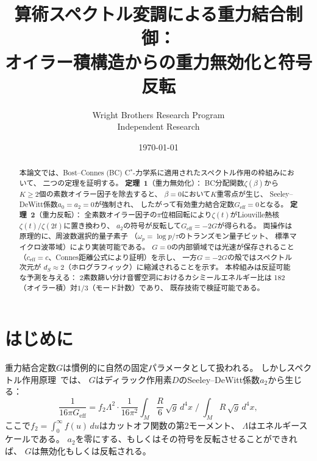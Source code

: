 \documentclass[a4paper,11pt]{article}
\begin{document}
\title{算術スペクトル変調による重力結合制御：\\
オイラー積構造からの重力無効化と符号反転}

\author{Wright Brothers Research Program\\
\small Independent Research}
\date{\today}

\maketitle

\begin{abstract}
本論文では、Bost--Connes (BC) C$^*$-力学系に適用されたスペクトル作用の枠組みにおいて、
二つの定理を証明する。
\textbf{定理~1}（重力無効化）：
BC分配関数$\zeta(\beta)$から$K \geq 2$個の素数オイラー因子を除去すると、
$\beta = 0$において$K$重零点が生じ、
Seeley--DeWitt係数$a_0 = a_2 = 0$が強制され、
したがって有効重力結合定数$G_{\mathrm{eff}} = 0$となる。
\textbf{定理~2}（重力反転）：
全素数オイラー因子の$\pi$位相回転により$\zeta(t)$がLiouville熱核
$\zeta(t)/\zeta(2t)$に置き換わり、
$a_2$の符号が反転して$G_{\mathrm{eff}} = -2G$が得られる。
両操作は原理的に、周波数選択的量子素子
（$\omega_p = \log p / \tau$のトランズモン量子ビット、
標準マイクロ波帯域）により実装可能である。
$G = 0$の内部領域では光速が保存されること
（$c_{\mathrm{eff}} = c$、Connes距離公式により証明）を示し、
一方$G = -2G$の殻ではスペクトル次元が
$d_S \approx 2$（ホログラフィック）に縮減されることを示す。
本枠組みは反証可能な予測を与える：
2素数篩い分け音響空洞におけるカシミールエネルギー比は
182（オイラー積）対$1/3$（モード計数）であり、
既存技術で検証可能である。
\end{abstract}

\section{はじめに}

重力結合定数$G$は慣例的に自然の固定パラメータとして扱われる。
しかしスペクトル作用原理~\cite{Chamseddine1996,Connes2006}では、
$G$はディラック作用素$D$のSeeley--DeWitt係数$a_2$から生じる：
\begin{equation}
  \frac{1}{16\pi G_{\mathrm{eff}}} = f_2 \Lambda^2 \cdot
  \frac{1}{16\pi^2}\int_M \frac{R}{6}\,\sqrt{g}\,d^4x \;\Big/\;
  \int_M R\,\sqrt{g}\,d^4x,
  \label{eq:G_from_a2}
\end{equation}
ここで$f_2 = \int_0^\infty f(u)\,du$はカットオフ関数の第2モーメント、
$\Lambda$はエネルギースケールである。
$a_2$を零にする、もしくはその符号を反転させることができれば、
$G$は無効化もしくは反転される。
\end{document}
